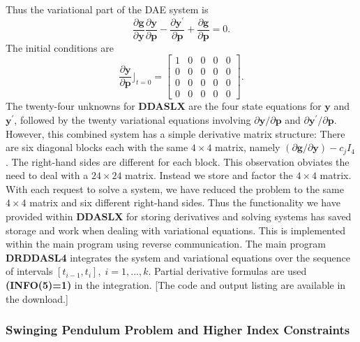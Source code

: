 \documentclass[twoside]{MATH77}
\begin{document}
Thus the variational part of the DAE system is
\begin{equation*}
  \frac{\partial \mathbf{g}}{\partial \mathbf{y}}
  \frac{\partial \mathbf{y}}{\partial \mathbf{p}}-\frac{\partial
    \mathbf{y}^{\prime}}{\partial \mathbf{p}}+
  \frac{\partial \mathbf{g}}{\partial \mathbf{p}}=0.
\end{equation*}
The initial conditions are
\begin{equation*}
  \frac{\partial \mathbf{y}}{\partial \mathbf{p}}\rfloor_{t=0}=
  \begin{bmatrix}
    1 & 0 & 0 & 0 & 0\\
    0 & 0 & 0 & 0 & 0\\
    0 & 0 & 0 & 0 & 0\\
    0 & 0 & 0 & 0 & 0
  \end{bmatrix}.
\end{equation*}
The twenty-four unknowns for \textbf{DDASLX} are the four state equations for
$\mathbf{y}$ and $\mathbf{y}^{\prime}$, followed by the twenty variational
equations involving $\partial \mathbf{y}/\partial \mathbf{p}$ and $\partial
\mathbf{y}^{\prime}/\partial \mathbf{p}$.  However, this combined system has a
simple derivative matrix structure: There are six diagonal blocks each with
the same $4\times4$ matrix, namely $(\partial \mathbf{g}/\partial
\mathbf{y})-c_{j}I_{4}$.  The right-hand sides are different for each block.
This observation obviates the need to deal with a $24\times24$ matrix.
Instead we store and factor the $4\times4$ matrix.  With each request to solve
a system, we have reduced the problem to the same $4\times4$ matrix and six
different right-hand sides.  Thus the functionality we have provided within
\textbf{DDASLX} for storing derivatives and solving systems has saved storage
and work when dealing with variational equations.  This is implemented within
the main program using reverse communication.  The main program
\textbf{DRDDASL4} integrates the system and variational equations over the
sequence of intervals $\left[ t_{i-1},t_{i}\right] ,\;i=1,...,k$.  Partial
derivative formulas are used \textbf{(INFO(5)=1)} in the integration.  [The
code and output listing are available in the download.]

\subsubsection{Swinging Pendulum Problem and Higher Index
  Constraints\label{swing2}}
\end{document}
